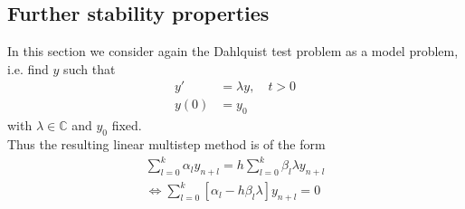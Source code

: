 	
	
	
	
	\subsection{Further stability properties}
	
	In this section we consider again the Dahlquist test problem as a model problem, i.e. find $y$ such that
	\begin{align}
		y' &= \lambda y, \quad t > 0 \\
		y(0) &= y_0
	\end{align}
	with $\lambda \in \mathbb{C}$ and $y_0$ fixed.\\
	
	
	Thus the resulting linear multistep method is of the form
	\begin{align*}
		\sum_{l=0}^{k} \alpha_l y_{n+l} = h \sum_{l=0}^{k} \beta_l \lambda y_{n+l} \\
		\iff \sum_{l=0}^{k}  [\alpha_l - h \beta_l \lambda] y_{n+l} = 0
	\end{align*}
	
	
